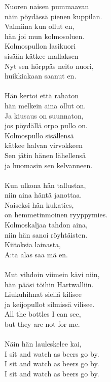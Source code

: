 
        Nuoren naisen pummaavan \\
        näin pöydässä pienen kuppilan. \\
        Valmiina kun ollut en, \\
        hän joi mun kolmosoluen. \\
        Kolmospullon lasikuori \\
        sisään kätkee mallaksen \\
        Nyt sen hörppäs neito nuori, \\
        huikkiakaan saanut en. \\
\hspace{10mm} \\
        Hän kertoi että rahaton \\
        hän melkein aina ollut on. \\
        Ja kiusaus on suunnaton, \\
        jos pöydällä orpo pullo on. \\
        Kolmospullo sisällensä \\
        kätkee halvan virvokkeen \\
        Sen jätin hänen lähellensä \\
        ja huomasin sen kelvanneen. \\
\hspace{10mm} \\
        Kun ulkona hän tallustaa, \\
        niin aina häntä janottaa. \\
        Naiseksi hän kukaties, \\
        on hemmetinmoinen ryyppymies. \\
        Kolmoskaljaa tahdon aina, \\
        niin hän sanoi röyhtäisten. \\
        Kiitoksia lainasta, \\
        A:ta alas saa mä en. \\
\hspace{10mm} \\
        Mut vihdoin viimein kävi niin, \\
        hän pääsi töihin Hartwalliin. \\
        Liukuhihnat siellä kilisee \\
        ja keijopullot silmissä vilisee. \\
        All the bottles I can see, \\
        but they are not for me. \\
\hspace{10mm} \\
        Näin hän lauleskelee kai, \\
        I sit and watch as beers go by. \\
        I sit and watch as beers go by. \\
        I sit and watch as beers go by. \\
